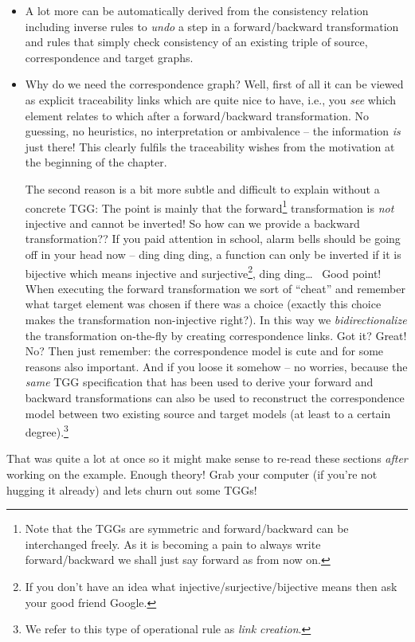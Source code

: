 \begin{itemize}

\item A lot more can be automatically derived from the consistency relation including inverse rules to \emph{undo} a step in a forward/backward
transformation~\cite{LAVS_ICGT_2012} and rules that simply check consistency of an existing triple of source, correspondence and target graphs.

\item Why do we need the correspondence graph? Well, first of all it can be viewed as explicit traceability links which are
quite nice to have, i.e., you \emph{see} which element relates to which after a forward/backward transformation.
No guessing, no heuristics, no interpretation or ambivalence -- the information \emph{is} just there! This clearly fulfils the traceability wishes from the
motivation at the beginning of the chapter.

The second reason is a bit more subtle and difficult to explain without a concrete TGG:  The point is mainly that the forward\footnote{Note that the TGGs are
symmetric and forward/backward can be interchanged freely.  As it is becoming a pain to always write forward/backward we shall just say forward as from now on.}
transformation is \emph{not} injective and cannot be inverted! So how can we provide a backward transformation?? If you paid attention in school, alarm bells
should be going off in your head now -- ding ding ding, a function can only be inverted if it is bijective which means injective and surjective\footnote{If you
don't have an idea what injective/surjective/bijective means then ask your good friend Google.}, ding ding\ldots~ Good point!  When executing the forward
transformation we sort of ``cheat'' and remember what target element was chosen if there was a choice (exactly this choice makes the transformation
non-injective right?).
In this way we \emph{bidirectionalize} the transformation on-the-fly by creating correspondence links.
Got it? Great! No?  Then just remember: the correspondence model is cute and for some reasons also important.
And if you loose it somehow -- no worries, because the \emph{same} TGG specification that has been used to derive your forward and backward transformations can
also be used to reconstruct the correspondence model between two existing source and target models (at least to a certain degree).\footnote{We refer to this
type of operational rule as \emph{link creation}.}

\end{itemize}

That was quite a lot at once so it might make sense to re-read these sections \emph{after} working on the example.
Enough theory!  Grab your computer (if you're not hugging it already) and lets churn out some TGGs!
